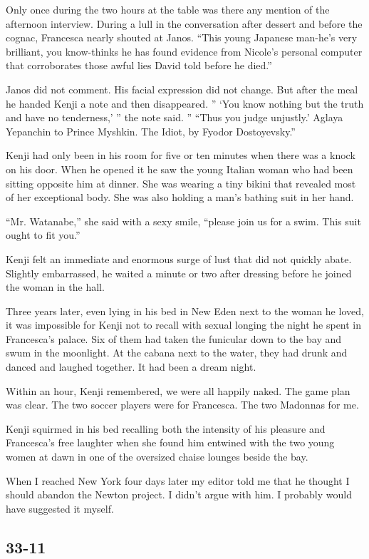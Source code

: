 \documentclass[]{article}
\begin{document}
{Only once during the two hours at the table was there any mention of the afternoon interview. During a lull in the conversation after dessert and before the cognac, Francesca nearly shouted at Janos. “This young Japanese man-he’s very brilliant, you know-thinks he has found evidence from Nicole’s personal computer that corroborates those awful lies David told before he died.”

Janos did not comment. His facial expression did not change. But after the meal he handed Kenji a note and then disappeared. ” ‘You know nothing but the truth and have no tenderness,’ ” the note said. ” “Thus you judge unjustly.’ Aglaya Yepanchin to Prince Myshkin. The Idiot, by Fyodor Dostoyevsky.”

Kenji had only been in his room for five or ten minutes when there was a knock on his door. When he opened it he saw the young Italian woman who had been sitting opposite him at dinner. She was wearing a tiny bikini that revealed most of her exceptional body. She was also holding a man’s bathing suit in her hand.

“Mr. Watanabe,” she said with a sexy smile, “please join us for a swim. This suit ought to fit you.”

Kenji felt an immediate and enormous surge of lust that did not quickly abate. Slightly embarrassed, he waited a minute or two after dressing before he joined the woman in the hall.

Three years later, even lying in his bed in New Eden next to the woman he loved, it was impossible for Kenji not to recall with sexual longing the night he spent in Francesca’s palace. Six of them had taken the funicular down to the bay and swum in the moonlight. At the cabana next to the water, they had drunk and danced and laughed together. It had been a dream night.

Within an hour, Kenji remembered, we were all happily naked. The game plan was clear. The two soccer players were for Francesca. The two Madonnas for me.

Kenji squirmed in his bed recalling both the intensity of his pleasure and Francesca’s free laughter when she found him entwined with the two young women at dawn in one of the oversized chaise lounges beside the bay.

When I reached New York four days later my editor told me that he thought I should abandon the Newton project. I didn’t argue with him. I probably would have suggested it myself.


\subsection{33-11}

}
\end{document}
